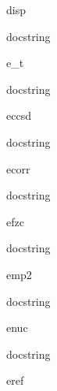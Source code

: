 \documentclass[letterpaper,10pt,english]{sphinxmanual}
\begin{document}
\begin{description}
\begin{description}
\begin{DUlineblock}{0em}
\item[] disp
\item[]
\begin{DUlineblock}{\DUlineblockindent}
\item[] docstring
\item[] 
\end{DUlineblock}
\item[] e\_t
\item[]
\begin{DUlineblock}{\DUlineblockindent}
\item[] docstring
\item[] 
\end{DUlineblock}
\item[] eccsd
\item[]
\begin{DUlineblock}{\DUlineblockindent}
\item[] docstring
\item[] 
\end{DUlineblock}
\item[] ecorr
\item[]
\begin{DUlineblock}{\DUlineblockindent}
\item[] docstring
\item[] 
\end{DUlineblock}
\item[] efzc
\item[]
\begin{DUlineblock}{\DUlineblockindent}
\item[] docstring
\item[] 
\end{DUlineblock}
\item[] emp2
\item[]
\begin{DUlineblock}{\DUlineblockindent}
\item[] docstring
\item[] 
\end{DUlineblock}
\item[] enuc
\item[]
\begin{DUlineblock}{\DUlineblockindent}
\item[] docstring
\item[] 
\end{DUlineblock}
\item[] eref
\item[]
\begin{DUlineblock}{\DUlineblockindent}

\end{DUlineblock}
\end{DUlineblock}
\end{description}
\end{description}
\end{document}
